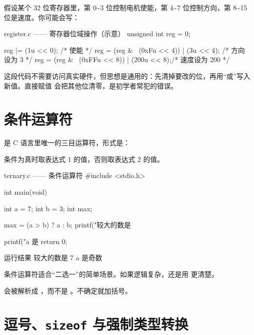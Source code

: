 \begin{deepbox}[拔高：寄存器配置就是这么干的]
假设某个 32 位寄存器里，第 0\textasciitilde3 位控制电机使能，第 4\textasciitilde7 位控制方向，第 8\textasciitilde15 位是速度。你可能会写：
\begin{codebox}{register.c —— 寄存器位域操作（示意）}
unsigned int reg = 0;

reg |= (1u << 0);                 /* 使能 */
reg = (reg & ~(0xFu << 4)) | (3u << 4);   /* 方向设为 3 */
reg = (reg & ~(0xFFu << 8)) | (200u << 8);/* 速度设为 200 */
\end{codebox}
这段代码不需要访问真实硬件，但思想是通用的：先清掉要改的位，再用“或”写入新值。直接赋值  会把其他位清零，是初学者常犯的错误。
\end{deepbox}

\section{条件运算符}

 是 C 语言里唯一的三目运算符，形式是：

\begin{center}
\end{center}

条件为真时取表达式 1 的值，否则取表达式 2 的值。

\begin{codebox}{ternary.c —— 条件运算符}
#include <stdio.h>

int main(void)
{
    int a = 7;
    int b = 3;
    int max;

    max = (a > b) ? a : b;
    printf("较大的数是 %

    printf("a 是%
    return 0;
}
\end{codebox}

\begin{outbox}{运行结果}
较大的数是 7
a 是奇数
\end{outbox}

条件运算符适合“二选一”的简单场景。如果逻辑复杂，还是用  更清楚。

\begin{pitfall}[条件运算符的优先级很低]
 会被解析成 ，而不是 。不确定就加括号。
\end{pitfall}

\section{逗号、\texttt{sizeof} 与强制类型转换}

